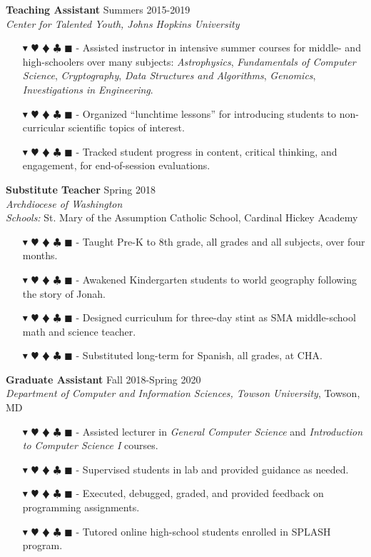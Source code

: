 \documentclass[overlapped, 10pt]{res} %
\newcommand{\physics}{$\blacktriangledown$}
\newcommand{\biochem}{$\varheartsuit$}
\newcommand{\shannon}{$\vardiamondsuit$}
\newcommand{\classic}{$\clubsuit$}
\newcommand{\quantum}{$\blacksquare$}
\newcommand{\physicscolor}{\color{YellowOrange}}
\newcommand{\biochemcolor}{\color{Emerald}}
\newcommand{\shannoncolor}{\color{Goldenrod}}
\newcommand{\classiccolor}{\color{Cyan}}
\newcommand{\quantumcolor}{\color{RedOrange}}
\newcommand{\tag}[1]{
    {\IfSubStr{#1}{\physics}{\physicscolor}{\color{White}}\physics}
    {\IfSubStr{#1}{\biochem}{\biochemcolor}{\color{White}}\biochem}
    {\IfSubStr{#1}{\shannon}{\shannoncolor}{\color{White}}\shannon}
    {\IfSubStr{#1}{\classic}{\classiccolor}{\color{White}}\classic}
    {\IfSubStr{#1}{\quantum}{\quantumcolor}{\color{White}}\quantum}
}
\begin{document}
\begin{resume}
\textbf{Teaching Assistant} \hfill Summers 2015-2019 \\
\textit{Center for Talented Youth, Johns Hopkins University}
\begin{itemize} \itemsep -2pt %
\item[\tag{\physics\biochem\shannon\classic}-] Assisted instructor in intensive summer courses for middle- and high-schoolers over many subjects: \textit{Astrophysics}, \textit{Fundamentals of Computer Science}, \textit{Cryptography}, \textit{Data Structures and Algorithms}, \textit{Genomics}, \textit{Investigations in Engineering}.
\item[\tag{\physics\biochem\shannon\classic\quantum}-] Organized ``lunchtime lessons'' for introducing students to non-curricular scientific topics of interest.
\item[\tag{}-] Tracked student progress in content, critical thinking, and engagement, for end-of-session evaluations.
\end{itemize}

\textbf{Substitute Teacher} \hfill Spring 2018 \\
\textit{Archdiocese of Washington} \\
\textit{Schools:} St. Mary of the Assumption Catholic School, Cardinal Hickey Academy
\begin{itemize} \itemsep -2pt %
\item[\tag{\physics\biochem\classic}-] Taught Pre-K to 8th grade, all grades and all subjects, over four months.
\item[\tag{}-] Awakened Kindergarten students to world geography following the story of Jonah.
\item[\tag{\physics\biochem}-] Designed curriculum for three-day stint as SMA middle-school math and science teacher.
\item[\tag{}-] Substituted long-term for Spanish, all grades, at CHA.
\end{itemize}

\textbf{Graduate Assistant} \hfill Fall 2018-Spring 2020 \\
\textit{Department of Computer and Information Sciences, Towson University}, Towson, MD
\begin{itemize} \itemsep -2pt %
\item[\tag{\classic}-] Assisted lecturer in \textit{General Computer Science} and \textit{Introduction to Computer Science I} courses.
\item[\tag{\classic}-] Supervised students in lab and provided guidance as needed.
\item[\tag{\classic}-] Executed, debugged, graded, and provided feedback on programming assignments.
\item[\tag{\classic}-] Tutored online high-school students enrolled in SPLASH program.
\end{itemize}


\end{resume}
\end{document}
